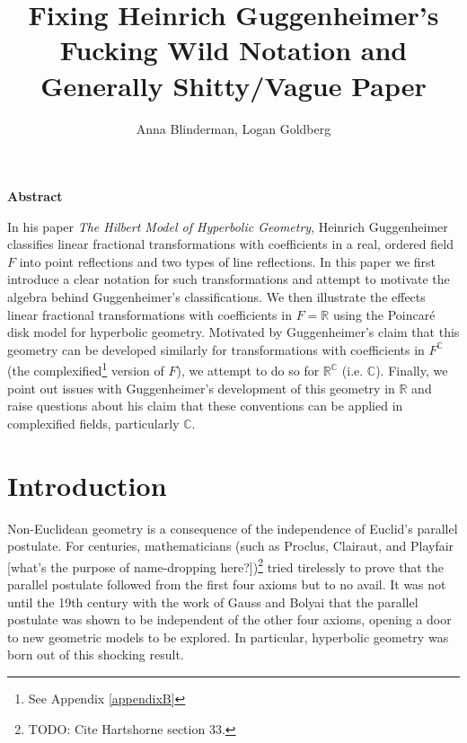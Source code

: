 \documentclass[12pt]{article}
\title{Fixing Heinrich Guggenheimer's Fucking Wild Notation and Generally Shitty/Vague Paper}
\author{Anna Blinderman, Logan Goldberg}
\date{}
\newcommand{\R}{\mathbb{R}}
\newcommand{\C}{\mathbb{C}}
\newcommand{\fc}{F^{\C}}
\newcommand{\poincare}{Poincar\'{e} }
\theoremstyle{plain}
\theoremstyle{definition}
\begin{document}
\maketitle

\newcommand{\wtftitle}[1]{\noindent\begin{Large}\textbf{{#1}}\end{Large}\vspace{3mm}}
\newcommand{\wtftheorem}[1]{\noindent\textbf{{#1}}. \hspace{1mm}}
\newcommand{\wtfqed}{\vspace{-5mm}\begin{flushright} \qedsymbol \end{flushright}}








\wtftitle{Abstract}

In his paper \textit{The Hilbert Model of Hyperbolic Geometry}, Heinrich Guggenheimer classifies linear fractional transformations with coefficients in a real, ordered field $F$ into point reflections and two types of line reflections. In this paper we first introduce a clear notation for such transformations and attempt to motivate the algebra behind Guggenheimer's classifications. We then illustrate the effects linear fractional transformations with coefficients in $F = \R$ using the \poincare disk model for hyperbolic geometry. Motivated by Guggenheimer's claim that this geometry can be developed similarly for transformations with coefficients in $\fc$ (the complexified\footnote{See Appendix \ref{appendixB}} version of $F$), we attempt to do so for $\R^{\C}$ (i.e. $\C$). Finally, we point out issues with Guggenheimer's development of this geometry in $\R$ and raise questions about his claim that these conventions can be applied in complexified fields, particularly $\C$.







\section{Introduction}

Non-Euclidean geometry is a consequence of the independence of Euclid's parallel postulate. For centuries, mathematicians (such as Proclus, Clairaut, and Playfair [what's the purpose of name-dropping here?])\footnote{TODO: Cite Hartshorne section 33.} tried tirelessly to prove that the parallel postulate followed from the first four axioms but to no avail. It was not until the 19th century with the work of Gauss and Bolyai that the parallel postulate was shown to be independent of the other four axioms, opening a door to new geometric models to be explored. In particular, hyperbolic geometry was born out of this shocking result. 
\end{document}
